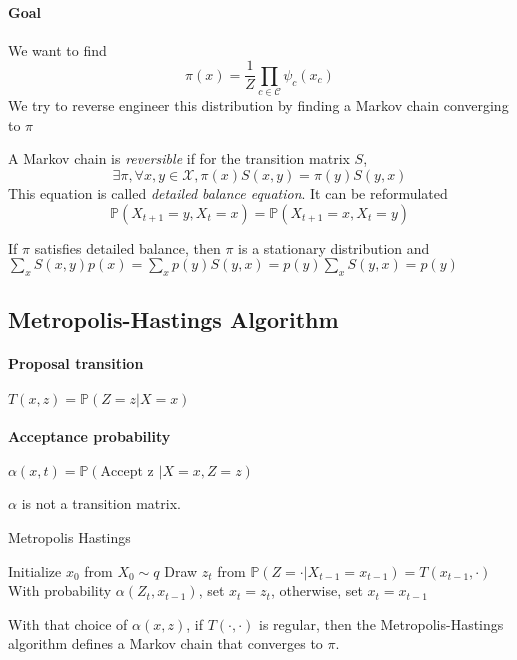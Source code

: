 \documentclass[12pt]{report}
\newcommand{\p}{\mathbb{P}}
\begin{document}
\paragraph{Goal}
We want to find $$ \pi(x) = \frac{1}{Z}\prod_{c \in \mathcal{C}} \psi_c(x_c) $$ We try to reverse engineer this distribution by finding a Markov chain converging to $\pi$

\begin{definition}
  A Markov chain is \emph{reversible} if for the transition matrix $S$, $$\exists \pi, \forall x,y \in \mathcal{X}, \pi(x)S(x,y) = \pi(y)S(y,x)$$
  This equation is called \emph{detailed balance equation}. It can be reformulated $$\p(X_{t+1}=y, X_t = x) = \p(X_{t+1}=x, X_t = y)$$
\end{definition}

\begin{proposition}
  If $\pi$ satisfies detailed balance, then $\pi$ is a stationary distribution and
  $\sum_x S(x, y)p(x) = \sum_x p(y)S(y, x) = p(y)\sum_x S(y, x) = p(y)$
\end{proposition}

\subsection{Metropolis-Hastings Algorithm}
\paragraph{Proposal transition}
$T(x,z) = \p(Z=z | X=x)$
\paragraph{Acceptance probability}
$\alpha(x,t) = \p(\text{Accept z }| X=x, Z=z)$
\begin{danger}
$\alpha$ is not a transition matrix.  
\end{danger}

\FloatBarrier
\begin{algorithm}
\caption{Metropolis Hastings}\label{RS}
\begin{algorithmic}[1]
\State Initialize $x_0$ from $X_0 \sim q$
  \State Draw $z_t$ from $\p(Z=\cdot|X_{t-1}=x_{t-1})=T(x_{t-1}, \cdot)$
  \State With probability $\alpha(Z_t, x_{t-1})$, set $x_t = z_t$, otherwise, set $x_t = x_{t-1}$
\EndFor
\end{algorithmic}
\end{algorithm}
\FloatBarrier

\begin{proposition}
  With that choice of $\alpha(x,z)$, if $T(\cdot, \cdot)$ is regular, then the Metropolis-Hastings algorithm defines a Markov chain that converges to $\pi$.
\end{proposition}
\end{document}
